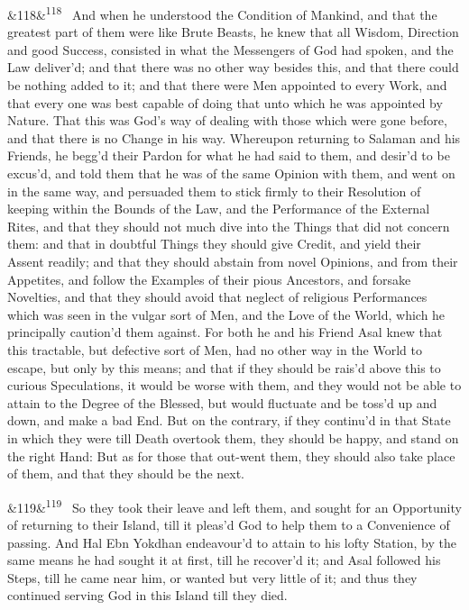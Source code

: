 \documentclass[12pt]{article}
\newcommand{\para}[1][]{\par\noindent\ifx&#1&\else\textsuperscript{\footnotesize #1}~\fi}
\begin{document}
\para[118] And when he understood the Condition of Mankind, and that the greatest part of them were like Brute Beasts, he knew that all Wisdom, Direction and good Success, consisted in what the Messengers of God had spoken, and the Law deliver'd; and that there was no other way besides this, and that there could be nothing added to it; and that there were Men appointed to every Work, and that every one was best capable of doing that unto which he was appointed by Nature. That this was God's way of dealing with those which were gone before, and that there is no Change in his way. Whereupon returning to Salaman and his Friends, he begg'd their Pardon for what he had said to them, and desir'd to be excus'd, and told them that he was of the same Opinion with them, and went on in the same way, and persuaded them to stick firmly to their Resolution of keeping within the Bounds of the Law, and the Performance of the External Rites, and that they should not much dive into the Things that did not concern them: and that in doubtful Things they should give Credit, and yield their Assent readily; and that they should abstain from novel Opinions, and from their Appetites, and follow the Examples of their pious Ancestors, and forsake Novelties, and that they should avoid that neglect of religious Performances which was seen in the vulgar sort of Men, and the Love of the World, which he principally caution'd them against. For both he and his Friend Asal knew that this tractable, but defective sort of Men, had no other way in the World to escape, but only by this means; and that if they should be rais'd above this to curious Speculations, it would be worse with them, and they would not be able to attain to the Degree of the Blessed, but would fluctuate and be toss'd up and down, and make a bad End. But on the contrary, if they continu'd in that State in which they were till Death overtook them, they should be happy, and stand on the right Hand: But as for those that out-went them, they should also take place of them, and that they should be the next.

\para[119] So they took their leave and left them, and sought for an Opportunity of returning to their Island, till it pleas'd God to help them to a Convenience of passing. And Hal Ebn Yokdhan endeavour'd to attain to his lofty Station, by the same means he had sought it at first, till he recover'd it; and Asal followed his Steps, till he came near him, or wanted but very little of it; and thus they continued serving God in this Island till they died.
\end{document}
